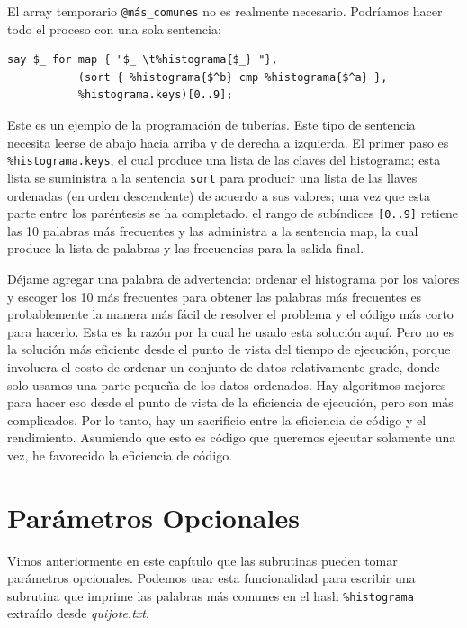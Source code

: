 El array temporario \verb|@más_comunes| no es realmente necesario.
Podríamos hacer todo el proceso con una sola sentencia:

\begin{verbatim}
say $_ for map { "$_ \t%histograma{$_} "},  
           (sort { %histograma{$^b} cmp %histograma{$^a} }, 
           %histograma.keys)[0..9];
\end{verbatim}

Este es un ejemplo de la programación de tuberías. Este tipo de sentencia
necesita leerse de abajo hacia arriba y de derecha a izquierda. El 
primer paso es \verb|%histograma.keys|, el cual produce una lista de
las claves del histograma; esta lista se suministra a la sentencia {\tt sort}
para producir una lista de las llaves ordenadas (en orden descendente)
de acuerdo a sus valores; una vez que esta parte entre los paréntesis
se ha completado, el rango de subíndices \verb|[0..9]| retiene las 10 
palabras más frecuentes y las administra a la sentencia map, la cual 
produce la lista de palabras y las frecuencias para la salida final.

Déjame agregar una palabra de advertencia: ordenar el histograma
por los valores y escoger los 10 más frecuentes para obtener las
palabras más frecuentes es probablemente la manera más fácil de 
resolver el problema y el código más corto para hacerlo.
Esta es la razón por la cual he usado esta solución aquí. Pero no es la
solución más eficiente desde el punto de vista del tiempo de ejecución,
porque involucra el costo de ordenar un conjunto de datos relativamente
grade, donde solo usamos una parte pequeña de los datos ordenados. Hay
algoritmos mejores para hacer eso desde el punto de vista de la
eficiencia de ejecución, pero son más complicados. Por lo tanto, hay 
un sacrificio entre la eficiencia de código y el rendimiento. Asumiendo que 
esto es código que queremos ejecutar solamente una vez, he favorecido
la eficiencia de código.


\section{Parámetros Opcionales}

Vimos anteriormente en este capítulo que las subrutinas pueden tomar
parámetros opcionales. Podemos usar esta funcionalidad para escribir
una subrutina que imprime las palabras más comunes en el 
hash \verb|%histograma| extraído desde \emph{quijote.txt}.

